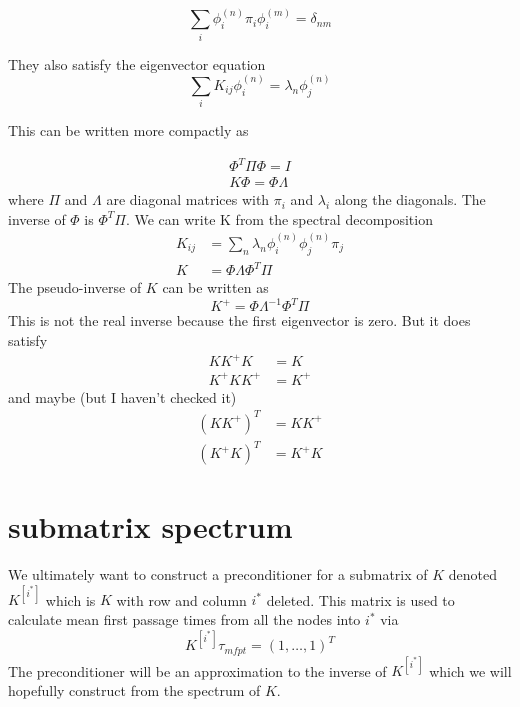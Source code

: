 \documentclass[a4paper]{article}
\newcommand{\evec}[2]{\phi^{(#2)}_{#1}}
\newcommand{\subK}{K^{[i^{*}]}}
\begin{document}
\begin{equation}
\sum_i \phi^{(n)}_i \pi_i \phi^{(m)}_i = \delta_{nm}
\end{equation}

They also satisfy the eigenvector equation
\begin{equation}
\sum_i K_{ij} \evec{i}{n}  = \lambda_n \evec{j}{n}
\end{equation}

This can be written more compactly as

\begin{align}
\Phi^{T} \Pi \Phi = I \\
K \Phi = \Phi \Lambda
\end{align}
where $\Pi$ and $\Lambda$ are diagonal matrices with $\pi_i$ and $\lambda_i$ along the diagonals.
The inverse of $\Phi$ is $\Phi^{T} \Pi$.
We can write K from the spectral decomposition
\begin{align}
K_{ij} &= \sum_n \lambda_n \evec{i}{n} \evec{j}{n} \pi_j \\
K &= \Phi \Lambda \Phi^T \Pi
\end{align}
The pseudo-inverse of $K$ can be written as
\begin{equation}
K^{+} = \Phi \Lambda^{-1} \Phi^T \Pi
\end{equation}
This is not the real inverse because the first eigenvector is zero.  But it does satisfy 
\begin{align}
K K^{+} K &= K \\
K^{+} K K^{+} &= K^{+}
\end{align}
and maybe (but I haven't checked it)
\begin{align}
(K K^{+})^T &= K K^{+} \\
(K^{+} K)^T &= K^{+} K
\end{align}

\section{submatrix spectrum}
We ultimately want to construct a preconditioner for a submatrix of $K$ denoted $\subK{}$ which is $K$
with row and column $i^{*}$ deleted.  This matrix is used to calculate mean first passage times from all the nodes
into $i^{*}$ via
\begin{equation}
\subK{} \tau_{mfpt} = (1, \dots, 1)^T
\end{equation}
The preconditioner will be an approximation to the inverse of $\subK{}$ which we will hopefully construct from 
the spectrum of $K$.
\end{document}
